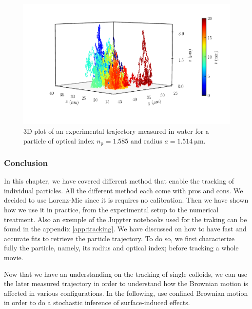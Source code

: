 \begin{figure}[H]
	\centering
	\includegraphics{02_body/chapter2/images/trajectory/traj.pdf}
	\caption{3D plot of an experimental trajectory measured in water for a particle of optical index $n_\mathrm{p} = 1.585$ and radius $a = 1.514  ~ \mathrm{\mu m}$.}
	\label{fig:3dtrajec}
\end{figure}

\subsubsection{Conclusion}

In this chapter, we have covered different method that enable the tracking of individual particles. All the different method each come with pros and cons. We decided to use Lorenz-Mie since it is requires no calibration. Then we have shown how we use it in practice, from the experimental setup to the numerical treatment. Also an exemple of the Jupyter notebooks used for the traking can be found in the appendix \ref{app:tracking}.  We have discussed on how to have fast and accurate fits to retrieve the particle trajectory. To do so, we first characterize fully the particle, namely, its radius and optical index; before tracking a whole movie. 

Now that we have an understanding on the tracking of single colloids, we can use the later measured trajectory in order to understand how the Brownian motion is affected in various configurations. In the following, use confined Brownian motion in order to do a stochastic inference of surface-induced effects.
